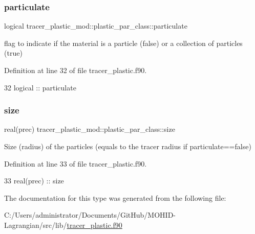\subsubsection{\texorpdfstring{particulate}{particulate}}
{\footnotesize\ttfamily logical tracer\+\_\+plastic\+\_\+mod\+::plastic\+\_\+par\+\_\+class\+::particulate\hspace{0.3cm}{\ttfamily [private]}}



flag to indicate if the material is a particle (false) or a collection of particles (true) 



Definition at line 32 of file tracer\+\_\+plastic.\+f90.


\begin{DoxyCode}
32         \textcolor{keywordtype}{logical}    :: particulate
\end{DoxyCode}
\mbox{\label{structtracer__plastic__mod_1_1plastic__par__class_a4436f491c11ebd046b3a74987ff71eee}} 
\subsubsection{\texorpdfstring{size}{size}}
{\footnotesize\ttfamily real(prec) tracer\+\_\+plastic\+\_\+mod\+::plastic\+\_\+par\+\_\+class\+::size\hspace{0.3cm}{\ttfamily [private]}}



Size (radius) of the particles (equals to the tracer radius if particulate==false) 



Definition at line 33 of file tracer\+\_\+plastic.\+f90.


\begin{DoxyCode}
33         \textcolor{keywordtype}{real(prec)} :: size
\end{DoxyCode}


The documentation for this type was generated from the following file\+:\begin{DoxyCompactItemize}
\item 
C\+:/\+Users/administrator/\+Documents/\+Git\+Hub/\+M\+O\+H\+I\+D-\/\+Lagrangian/src/lib/\mbox{\hyperlink{tracer__plastic_8f90}{tracer\+\_\+plastic.\+f90}}\end{DoxyCompactItemize}
